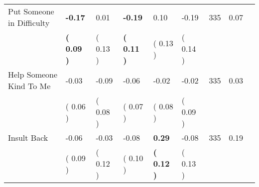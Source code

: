 \begin{tabular}{L{6.2cm} C{1.8cm} C{1.8cm} C{1.8cm} C{1.8cm} C{1.8cm} C{1.8cm} C{0.3cm} C{0.3cm}}
Put Someone in Difficulty & \textbf{    -0.17} &      0.01 & \textbf{    -0.19} &      0.10 &     -0.19  & 335 &       0.07 \\ 
 & \textbf{(     0.09 )} & (     0.13 ) & \textbf{(     0.11 )} & (     0.13 ) & (     0.14 )  & \\
Help Someone Kind To Me &     -0.03 &     -0.09 &     -0.06 &     -0.02 &     -0.02  & 335 &       0.03 \\ 
 & (     0.06 ) & (     0.08 ) & (     0.07 ) & (     0.08 ) & (     0.09 )  & \\
Insult Back &     -0.06 &     -0.03 &     -0.08 & \textbf{     0.29} &     -0.08  & 335 &       0.19 \\ 
 & (     0.09 ) & (     0.12 ) & (     0.10 ) & \textbf{(     0.12 )} & (     0.13 )  & \\
\bottomrule
\end{tabular}
